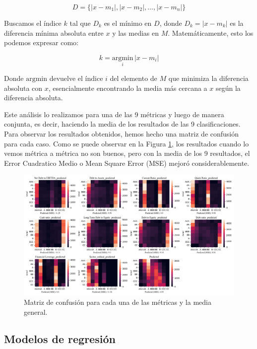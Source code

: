 \documentclass{article}
\begin{document}
\[
D = \{|x - m_1|, |x - m_2|, \ldots, |x - m_n|\}
\]

Buscamos el índice \( k \) tal que \( D_k \) es el mínimo en \( D \), donde \( D_k = |x - m_k| \) es la diferencia mínima absoluta entre \( x \) y las medias en \( M \). Matemáticamente, esto los podemos expresar como:

\[
k = \underset{i}{\mathrm{argmin}} \, |x - m_i|
\]

Donde \( \mathrm{argmin} \) devuelve el índice \( i \) del elemento de \( M \) que minimiza la diferencia absoluta con \( x \), esencialmente encontrando la media más cercana a \( x \) según la diferencia absoluta. 

Este análisis lo realizamos para una de las 9 métricas y luego de manera conjunta, es decir, haciendo la media de los resultados de las 9 clasificaciones. Para observar los resultados obtenidos, hemos hecho una matriz de confusión para cada caso. Como se puede observar en la Figura \ref{fig:confusion_matrix_por_metrica}, los resultados cuando lo vemos métrica a métrica no son buenos, pero con la media de los 9 resultados, el Error Cuadratico Medio o Mean Square Error (MSE) mejoró considerablemente.

\begin{figure}[H]
\centering
\includegraphics[width=1\textwidth]{confusion_matrix_por_metrica.png}
\caption{Matriz de confusión para cada una de las métricas y la media general.}
\label{fig:confusion_matrix_por_metrica}
\end{figure}

\subsection{Modelos de regresión}
\end{document}
